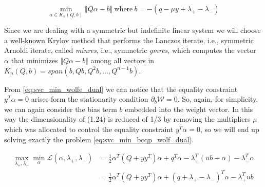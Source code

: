 \begin{equation}
	\min_{\alpha \in K_n(Q, b)} \Vert Q \alpha - b \Vert \ \text{where} \ b = - (q - \mu y + \lambda_+ - \lambda_-) \tag{1.30}
\end{equation}

Since we are dealing with a symmetric but indefinite linear system we will choose a well-known Krylov method that performs the Lanczos iterate, i.e., symmetric Arnoldi iterate, called \emph{minres}, i.e., symmetric \emph{gmres}, which computes the vector $\alpha$ that minimizes $\Vert Q \alpha - b \Vert$ among all vectors in $K_n(Q, b) = span(b, Qb, Q^2b, \dots, Q^{n-1}b)$.

From \ref{eq:svc_min_wolfe_dual} we can notice that the equality constraint $y^T \alpha = 0$ arises form the stationarity condition $\partial_{{b}} \mathcal{W}=0$. So, again, for simplicity, we can again consider the bias term $b$ embedded into the weight vector. In this way the dimensionality of (1.24) is reduced of 1/3 by removing the multipliers $\mu$ which was allocated to control the equality constraint $y^T \alpha=0$, so we will end up solving exactly the problem \ref{eq:svc_min_bcqp_wolf_dual}.

\begin{align*}
    \max_{\lambda_+,\lambda_-} \min_{\alpha} \mathcal{L}(\alpha,\lambda_+,\lambda_-) &= \frac{1}{2} \alpha^T (Q + yy^T)\alpha+q^T\alpha - \lambda_+^T (ub - \alpha) - \lambda_-^T \alpha \\
    &= \frac{1}{2} \alpha^T (Q + yy^T)\alpha + (q + \lambda_+ - \lambda_-)^T \alpha - \lambda_+^T ub \tag{1.31}
\end{align*}